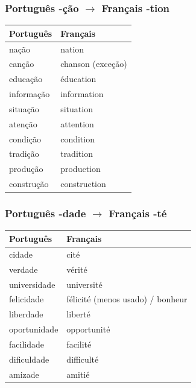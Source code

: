 \documentclass[a4paper,12pt]{article}
\begin{document}
\subsubsection{Português -ção $\to$ Français -tion}
\begin{tabular}{ll}
    \toprule
    Português & Français \\
    \midrule
    nação & nation \\
    canção & chanson (exceção) \\
    educação & éducation \\
    informação & information \\
    situação & situation \\
    atenção & attention \\
    condição & condition \\
    tradição & tradition \\
    produção & production \\
    construção & construction \\
    \bottomrule
\end{tabular}

\subsubsection{Português -dade $\to$ Français -té}
\begin{tabular}{ll}
    \toprule
    Português & Français \\
    \midrule
    cidade & cité \\
    verdade & vérité \\
    universidade & université \\
    felicidade & félicité (menos usado) / bonheur \\
    liberdade & liberté \\
    oportunidade & opportunité \\
    facilidade & facilité \\
    dificuldade & difficulté \\
    amizade & amitié \\
    \bottomrule
\end{tabular}
\end{document}
